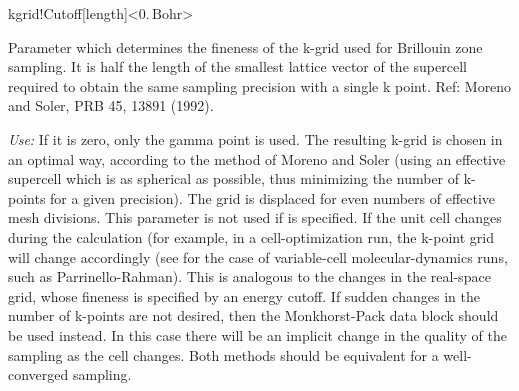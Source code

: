\begin{fdfentry}{kgrid!Cutoff}[length]<$0.\,\mathrm{Bohr}$>

  Parameter which determines the fineness of the k-grid used for
  Brillouin zone sampling.  It is half the length of the smallest
  lattice vector of the supercell required to obtain the same sampling
  precision with a single k point.  Ref: Moreno and Soler, PRB 45,
  13891 (1992).

  \textit{Use:} If it is zero, only the gamma point is used.  The resulting
  k-grid is chosen in an optimal way, according to the method of Moreno
  and Soler (using an effective supercell which is as spherical as
  possible, thus minimizing the number of k-points for a given
  precision). The grid is displaced for even numbers of effective mesh
  divisions.  This parameter is not used if 
  is specified. If the unit cell changes during the calculation (for
  example, in a cell-optimization run, the k-point
  grid will change accordingly (see  for the case
  of variable-cell molecular-dynamics runs, such as Parrinello-Rahman).
  This is analogous to the changes in the
  real-space grid, whose fineness is specified by an energy cutoff. If
  sudden changes in the number of k-points are not desired, then the
  Monkhorst-Pack data block should be used instead. In this case there
  will be an implicit change in the quality of the sampling as the cell
  changes. Both methods should be equivalent for a well-converged
  sampling.
  
\end{fdfentry}


